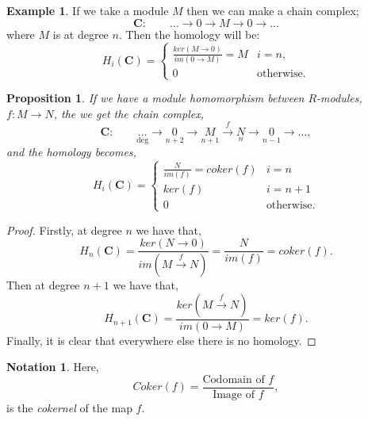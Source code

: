 \documentclass[11.5pt, twoside, a4paper, titlepage]{report}
\providecommand{\equ}[0]{\begin{equation*}}
\providecommand{\eequ}[0] {\end{equation*}}
\theoremstyle{definition}
\newtheorem{note}[mydef]{Notation}
\newtheorem{eg}[mydef]{Example}
\theoremstyle{plain}
\newtheorem{prop}[mydef]{Proposition}
\begin{document}
\begin{eg}
 \label{chainMeg}
 If we take a module $M$ then we can make a chain complex;
\begin{equation*}
\mathbf{C}: \qquad \dots \xrightarrow{} 0 \xrightarrow{} M \xrightarrow{} 0 \xrightarrow{} \dots
\end{equation*}
where $M$ is at degree $n$. Then the homology will be:
\begin{equation*}
H_i(\mathbf{C})=\begin{cases}
\frac{ker(M \rightarrow 0)}{im(0 \rightarrow M)}=M & i=n,\\
0 & \text{otherwise}.
\end{cases}
\end{equation*}
\end{eg}

\begin{prop}  \label{chainhomprop}
If we have a module homomorphism between $R$-modules, $f: M \xrightarrow{} N$, the we get the chain complex,
\equ
\mathbf{C}: \qquad \underset{\text{deg}}{\dots} \xrightarrow{}\underset{n+2}{0} \xrightarrow{} \underset{n+1}{M} \xrightarrow{f}\underset{n}{N} \xrightarrow{} \underset{n-1}{0} \xrightarrow{}\dots ,
\eequ
and the homology becomes,
\equ
H_i(\mathbf{C})=
\begin{cases}
\frac{N}{im(f)}=coker(f) & i=n\\
ker(f) & i=n+1\\
0 & \text{otherwise}.
\end{cases}
\eequ
\end{prop}
\begin{proof}
Firstly, at degree $n$ we have that,
\equ
H_n(\mathbf{C})=\frac{ker(N\xrightarrow{}0)}{im(M\xrightarrow{f}N)}=\frac{N}{im(f)}=coker(f).
\eequ
Then at degree $n+1$ we have that,
\equ
H_{n+1}(\mathbf{C})=\frac{ker(M\xrightarrow{f}N)}{im(0\xrightarrow{}M)}=ker(f).
\eequ
Finally, it is clear that everywhere else there is no homology.
\end{proof}

\begin{note}
Here, 
\equ
Coker(f)= \frac{\text{Codomain of }f}{\text{Image of }f},
\eequ
is the \emph{cokernel} of the map $f$.
\end{note}
\end{document}
